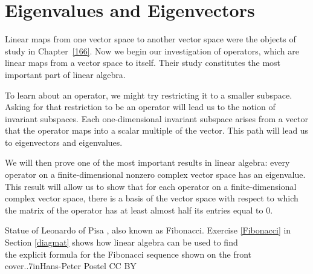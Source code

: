 
\chapter{Eigenvalues and Eigenvectors} \label{eigs}  %

Linear maps from one vector space to another vector space were the objects of study in Chapter~\ref{166}.  Now we begin our investigation of operators, which are linear maps from a vector space to itself.  Their study constitutes the most important part of linear algebra.

To learn about an operator, we might try restricting it to a smaller subspace. Asking for that restriction to be an operator will lead us to the notion of invariant subspaces. Each one-dimensional invariant subspace arises from a vector that the operator maps into a scalar multiple of the vector. This path will lead us to eigenvectors and eigenvalues.

We will then prove one of the most important results in linear algebra: every operator on a finite-dimensional nonzero complex vector space  has an eigenvalue. This result will allow us to show that for each operator on a finite-dimensional complex vector space, there is a basis of the vector space with respect to which the matrix of the operator has at least almost half its entries equal to $0$.

%
{Statue of Leonardo of Pisa , also known as Fibonacci. Exercise \ref{Fibonacci} in Section \ref{diagmat} shows how linear algebra can be used to find\\the explicit formula for the Fibonacci sequence shown on the front cover.}{.7in}{Hans-Peter Postel CC BY}

